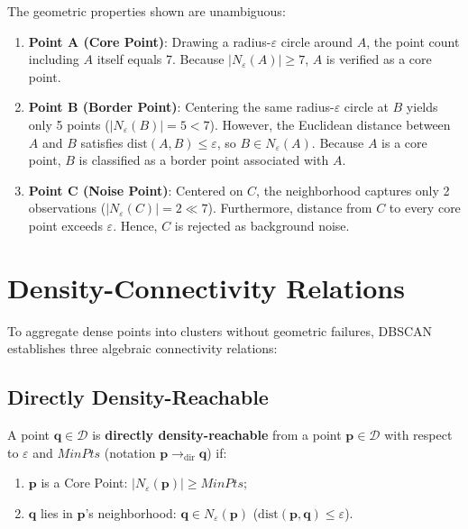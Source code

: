 The geometric properties shown are unambiguous:
\begin{enumerate}
    \item \textbf{Point A (Core Point)}: Drawing a radius-$\varepsilon$ circle around $A$, the point count including $A$ itself equals 7. Because $|N_\varepsilon(A)| \ge 7$, $A$ is verified as a core point.
    \item \textbf{Point B (Border Point)}: Centering the same radius-$\varepsilon$ circle at $B$ yields only 5 points ($|N_\varepsilon(B)| = 5 < 7$). However, the Euclidean distance between $A$ and $B$ satisfies $\mathrm{dist}(A, B) \le \varepsilon$, so $B \in N_\varepsilon(A)$. Because $A$ is a core point, $B$ is classified as a border point associated with $A$.
    \item \textbf{Point C (Noise Point)}: Centered on $C$, the neighborhood captures only 2 observations ($|N_\varepsilon(C)| = 2 \ll 7$). Furthermore, distance from $C$ to every core point exceeds $\varepsilon$. Hence, $C$ is rejected as background noise.
\end{enumerate}

\section{Density-Connectivity Relations}
\label{sec:dm-dbscan-reachability-connectivity}

To aggregate dense points into clusters without geometric failures, DBSCAN establishes three algebraic connectivity relations:

\subsection{Directly Density-Reachable}

\begin{definition}
A point $\mathbf{q} \in \mathcal{D}$ is \textbf{directly density-reachable} from a point $\mathbf{p} \in \mathcal{D}$ with respect to $\varepsilon$ and $MinPts$ (notation $\mathbf{p} \to_{\mathrm{dir}} \mathbf{q}$) if:
\begin{enumerate}
    \item $\mathbf{p}$ is a Core Point: $|N_\varepsilon(\mathbf{p})| \ge MinPts$;
    \item $\mathbf{q}$ lies in $\mathbf{p}$'s neighborhood: $\mathbf{q} \in N_\varepsilon(\mathbf{p})$ ($\mathrm{dist}(\mathbf{p}, \mathbf{q}) \le \varepsilon$).
\end{enumerate}
\end{definition}

